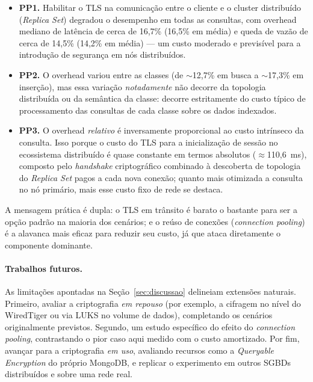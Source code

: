 \documentclass[12pt]{article}
\begin{document}
\begin{itemize}
  \item \textbf{PP1.} Habilitar o TLS na comunicação entre o cliente e o cluster distribuído (\emph{Replica Set}) degradou o desempenho em todas as consultas, com overhead mediano de latência de cerca de 16,7\% (16,5\% em média) e queda de vazão de cerca de 14,5\% (14,2\% em média) --- um custo moderado e previsível para a introdução de segurança em nós distribuídos.

  \item \textbf{PP2.} O overhead variou entre as classes (de $\sim$12,7\% em busca a $\sim$17,3\% em inserção), mas essa variação \emph{notadamente} não decorre da topologia distribuída ou da semântica da classe: decorre estritamente do custo típico de processamento das consultas de cada classe sobre os dados indexados.

  \item \textbf{PP3.} O overhead \emph{relativo} é inversamente proporcional ao custo intrínseco da consulta. Isso porque o custo do TLS para a inicialização de sessão no ecossistema distribuído é quase constante em termos absolutos ($\approx$110,6~ms), composto pelo \emph{handshake} criptográfico combinado à descoberta de topologia do \emph{Replica Set} pagos a cada nova conexão; quanto mais otimizada a consulta no nó primário, mais esse custo fixo de rede se destaca.

\end{itemize}


A mensagem prática é dupla: o TLS em trânsito é barato o bastante para ser a
opção padrão na maioria dos cenários; e o reúso de conexões (\emph{connection
pooling}) é a alavanca mais eficaz para reduzir seu custo, já que ataca
diretamente o componente dominante.

\paragraph{Trabalhos futuros.} As limitações apontadas na
Seção~\ref{sec:discussao} delineiam extensões naturais. Primeiro, avaliar a
criptografia \emph{em repouso} (por exemplo, a cifragem no nível do WiredTiger ou
via LUKS no volume de dados), completando os cenários originalmente previstos.
Segundo, um estudo específico do efeito do
\emph{connection pooling}, contrastando o pior caso aqui medido com o custo
amortizado. Por fim, avançar para a criptografia \emph{em uso}, avaliando
recursos como a \emph{Queryable Encryption} do próprio MongoDB, e replicar o
experimento em outros SGBDs distribuídos e sobre uma rede real.




\end{document}
